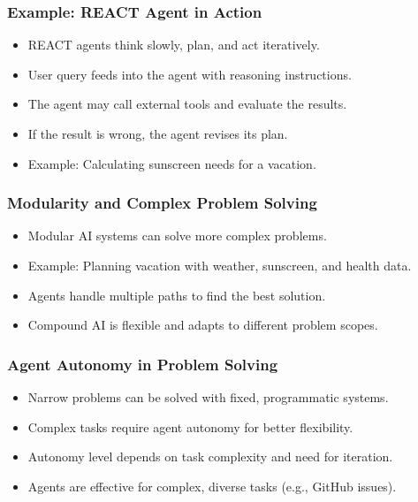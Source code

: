 \begin{frame}[fragile]\frametitle{Example: REACT Agent in Action}
    \begin{itemize}
        \item REACT agents think slowly, plan, and act iteratively.
        \item User query feeds into the agent with reasoning instructions.
        \item The agent may call external tools and evaluate the results.
        \item If the result is wrong, the agent revises its plan.
        \item Example: Calculating sunscreen needs for a vacation.
    \end{itemize}
\end{frame}

\begin{frame}[fragile]\frametitle{Modularity and Complex Problem Solving}
    \begin{itemize}
        \item Modular AI systems can solve more complex problems.
        \item Example: Planning vacation with weather, sunscreen, and health data.
        \item Agents handle multiple paths to find the best solution.
        \item Compound AI is flexible and adapts to different problem scopes.
    \end{itemize}
\end{frame}

\begin{frame}[fragile]\frametitle{Agent Autonomy in Problem Solving}
    \begin{itemize}
        \item Narrow problems can be solved with fixed, programmatic systems.
        \item Complex tasks require agent autonomy for better flexibility.
        \item Autonomy level depends on task complexity and need for iteration.
        \item Agents are effective for complex, diverse tasks (e.g., GitHub issues).
    \end{itemize}
\end{frame}

